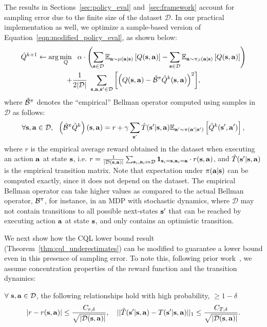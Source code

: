 The results in Sections~\ref{sec:policy_eval} and~\ref{sec:framework} account for sampling error due to the finite size of the dataset $\mathcal{D}$. In our practical implementation as well, we optimize a sample-based version of Equation~\ref{eqn:modified_policy_eval}, as shown below:
\begin{multline}
    \small{\hat{Q}^{k+1} \leftarrow \arg\min_{Q}~~ \alpha \cdot \left(\sum_{\mathbf{s}\in \mathcal{D}} \mathbb{E}_{\mathbf{a}\sim \mu(\mathbf{a}|\mathbf{s})}\left[Q(\mathbf{s}, \mathbf{a})\right] - {\sum_{\mathbf{s}\in \mathcal{D}} \mathbb{E}_{\mathbf{a}\sim {\pi_\beta}(\mathbf{a}|\mathbf{s})}\left[Q(\mathbf{s}, \mathbf{a})\right]} \right)} \\
    \small{+ \frac{1}{2 |\mathcal{D}|}~ \sum_{\mathbf{s}, \mathbf{a}, \mathbf{s}' \in \mathcal{D}}\left[\left(Q(\mathbf{s}, \mathbf{a}) - \hat{\mathcal{B}}^\pi\hat{Q}^{k} (\mathbf{s}, \mathbf{a}) \right)^2 \right]},
    \label{eqn:sampled_policy_eval}
\end{multline}
where $\hat{\mathcal{B}}^\pi$ denotes the ``empirical'' Bellman operator computed using samples in $\mathcal{D}$ as follows:
\begin{equation}
\label{eqn:app_empirical_bellman}
    \forall \mathbf{s}, \mathbf{a} \in \mathcal{D}, ~~ \left(\hat{\mathcal{B}}^\pi \hat{Q}^k \right)(\mathbf{s}, \mathbf{a}) = r + \gamma \sum_{\mathbf{s}'} \hat{T}(\mathbf{s}'|\mathbf{s}, \mathbf{a}) \mathbb{E}_{\mathbf{a}' \sim \pi(\mathbf{a}'|\mathbf{s}')}\left[\hat{Q}^k(\mathbf{s}' , \mathbf{a}')\right],  
\end{equation}
where $r$ is the empirical average reward obtained in the dataset when executing an action $\mathbf{a}$ at state $\mathbf{s}$, i.e. \mbox{$r = \frac{1}{|\mathcal{D}(\mathbf{s}, \mathbf{a})|} \sum_{\mathbf{s}_i, \mathbf{a}_i in \mathcal{D}} \mathbf{1}_{\mathbf{s}_i = \mathbf{s}, \mathbf{a}_i = \mathbf{a}} \cdot r(\mathbf{s}, \mathbf{a})$}, and $\hat{T}(\mathbf{s}'|\mathbf{s}, \mathbf{a})$ is the empirical transition matrix.
Note that expectation under $\pi(\mathbf{a}|\mathbf{s})$ can be computed exactly, since it does not depend on the dataset. The empirical Bellman operator can take higher values as compared to the actual Bellman operator, $\mathcal{B}^\pi$, for instance, in an MDP with stochastic dynamics, where $\mathcal{D}$ may not contain transitions to all possible next-states $\mathbf{s}'$ that can be reached by executing action $\mathbf{a}$ at state $\mathbf{s}$, and only contains an optimistic transition. 

We next show how the CQL lower bound result (Theorem~\ref{thm:cql_underestimates}) can be modified to guarantee a lower bound even in this presence of sampling error. To note this, following prior work~\citep{jaksch2010near,osband2017posterior}, we assume concentration properties of the reward function and the transition dynamics:
\begin{assumption}
    $\forall~ \mathbf{s}, \mathbf{a} \in \mathcal{D}$, the following relationships hold with high probability, $\geq 1 - \delta$
    \begin{equation*}
        |r - r(\mathbf{s}, \mathbf{a})| \leq \frac{C_{r, \delta}}{\sqrt{|\mathcal{D}(\mathbf{s}, \mathbf{a})|}}, ~~~ ||\hat{T}(\mathbf{s}'|\mathbf{s}, \mathbf{a}) - T(\mathbf{s}'|\mathbf{s}, \mathbf{a})||_{1} \leq \frac{C_{T, \delta}}{\sqrt{|\mathcal{D}(\mathbf{s}, \mathbf{a})|}}.
    \end{equation*}
\end{assumption}

